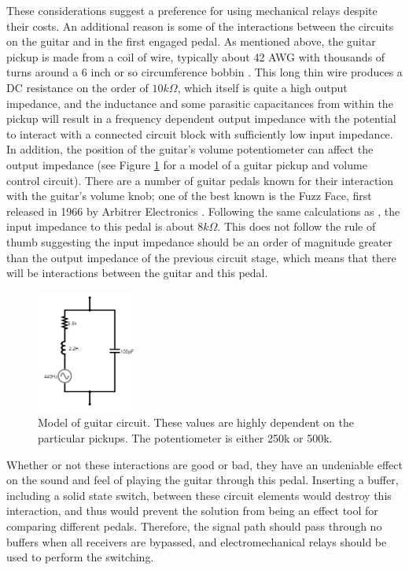 \documentclass{article}
\begin{document}
		These considerations suggest a preference for using mechanical relays despite their costs.  An additional reason is some of the interactions between the circuits on the guitar and in the first engaged pedal.  As mentioned above, the guitar pickup is made from a coil of wire, typically about 42 AWG with thousands of turns around a 6 inch or so circumference bobbin \cite{StewMacpickups}.  This long thin wire produces a DC resistance on the order of $10k\Omega$, which itself is quite a high output impedance, and the inductance and some parasitic capacitances from within the pickup will result in a frequency dependent output impedance with the potential to interact with a connected circuit block with sufficiently low input impedance.  In addition, the position of the guitar's volume potentiometer can affect the output impedance (see Figure \ref{fig:guitarpickupmodel} for a model of a guitar pickup and volume control circuit).  There are a number of guitar pedals known for their interaction with the guitar's volume knob; one of the best known is the Fuzz Face, first released in 1966 by Arbitrer Electronics \cite{FuzzFace}.  Following the same calculations as \cite{FuzzFace}, the input impedance to this pedal is about $8k\Omega$.  This does not follow the rule of thumb suggesting the input impedance should be an order of magnitude greater than the output impedance of the previous circuit stage, which means that there will be interactions between the guitar and this pedal.

		\begin{figure}
			\centering
			\includegraphics[width = 0.3\textwidth]{PR2Images/GuitarPickupModel}
			\caption{Model of guitar circuit.  These values are highly dependent on the particular pickups.  The potentiometer is either 250k or 500k.}
			\label{fig:guitarpickupmodel}
		\end{figure}

		Whether or not these interactions are good or bad, they have an undeniable effect on the sound and feel of playing the guitar through this pedal.  Inserting a buffer, including a solid state switch, between these circuit elements would destroy this interaction, and thus would prevent the solution from being an effect tool for comparing different pedals.  Therefore, the signal path should pass through no buffers when all receivers are bypassed, and electromechanical relays should be used to perform the switching.
\end{document}
